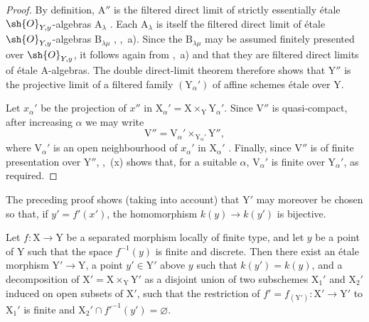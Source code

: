 \begin{proof}
By definition, $\mathrm{A}''$ is the filtered direct limit of strictly essentially \'etale $\sh{O}_{Y,y}$-algebras $\mathrm{A}_\lambda$ . Each $\mathrm{A}_\lambda$ is itself the filtered direct limit of \'etale $\sh{O}_{Y,y}$-algebras $\mathrm{B}_{\lambda\mu}$ , ,~a). Since the $\mathrm{B}_{\lambda\mu}$ may be assumed finitely presented over $\sh{O}_{Y,y}$, it follows again from ,~a) and  that they are filtered direct limits of \'etale $\mathrm{A}$-algebras. The double direct-limit theorem therefore shows that $\mathrm{Y}''$ is the projective limit of a filtered family $(\mathrm{Y}_\alpha')$ of affine schemes \'etale over $\mathrm{Y}$.

Let $x_\alpha'$ be the projection of $x''$ in $\mathrm{X}_\alpha'=\mathrm{X}\times_{\mathrm{Y}}\mathrm{Y}_\alpha'$. Since $\mathrm{V}''$ is quasi-compact, after increasing $\alpha$ we may write
\[
  \mathrm{V}''=\mathrm{V}_\alpha'\times_{\mathrm{Y}_\alpha'}\mathrm{Y}'',
\]
where $\mathrm{V}_\alpha'$ is an open neighbourhood of $x_\alpha'$ in $\mathrm{X}_\alpha'$ . Finally, since $\mathrm{V}''$ is of finite presentation over $\mathrm{Y}''$, ,~(x) shows that, for a suitable $\alpha$, $\mathrm{V}_\alpha'$ is finite over $\mathrm{Y}_\alpha'$, as required.
\end{proof}

\begin{remark}[18.12.2]
\label{IV.18.12.2}
The preceding proof shows (taking  into account) that $\mathrm{Y}'$ may moreover be chosen so that, if $y'=f'(x')$, the homomorphism $k(y)\to k(y')$ is bijective.
\end{remark}

\begin{corollary}[18.12.3]
\label{IV.18.12.3}
Let $f:\mathrm{X}\to\mathrm{Y}$ be a separated morphism locally of finite type, and let $y$ be a point of $\mathrm{Y}$ such that the space $f^{-1}(y)$ is finite and discrete.
Then there exist an \'etale morphism $\mathrm{Y}'\to\mathrm{Y}$, a point $y'\in\mathrm{Y}'$ above $y$ such that $k(y')=k(y)$, and a decomposition of $\mathrm{X}'=\mathrm{X}\times_{\mathrm{Y}}\mathrm{Y}'$ as a disjoint union of two subschemes $\mathrm{X}_1'$ and $\mathrm{X}_2'$ induced on open subsets of $\mathrm{X}'$, such that the restriction of $f'=f_{(\mathrm{Y}')}:\mathrm{X}'\to\mathrm{Y}'$ to $\mathrm{X}_1'$ is finite and $\mathrm{X}_2'\cap f'^{-1}(y')=\varnothing$.
\end{corollary}


